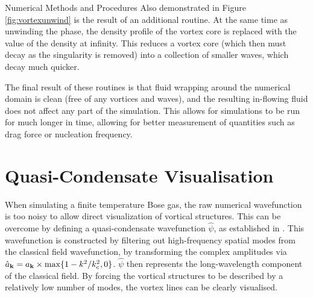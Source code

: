 \begin{chapter}{\label{cha:numerics}Numerical Methods and Procedures}
Also demonstrated in Figure \ref{fig:vortexunwind} is the result of an additional routine. At the same time as unwinding the phase, the density profile of the vortex core is replaced with the value of the density at infinity. This reduces a vortex core (which then must decay as the singularity is removed) into a collection of smaller waves, which decay much quicker.

The final result of these routines is that fluid wrapping around the numerical domain is clean (free of any vortices and waves), and the resulting in-flowing fluid does not affect any part of the simulation. This allows for simulations to be run for much longer in time, allowing for better measurement of quantities such as drag force or nucleation frequency.

\section{\label{section:quasi-condensate} Quasi-Condensate Visualisation}
When simulating a finite temperature Bose gas, the raw numerical wavefunction is too noisy to allow direct visualization of vortical structures. This can be overcome by defining a quasi-condensate wavefunction $\hat{\psi}$, as established in \cite{PhysRevA.66.013603}. This wavefunction is constructed by filtering out high-frequency spatial modes from the classical field wavefunction, by 
transforming the complex amplitudes via
$\hat{a}_{{\bf k}} = a_{{\bf k}}\times\max\{1-k^{2}/k_c^2,0\}$. $\hat{\psi}$ then represents the long-wavelength component of the classical field. By forcing the vortical structures to be described by a relatively low number of modes, the vortex lines can be clearly visualised.


\end{chapter}
